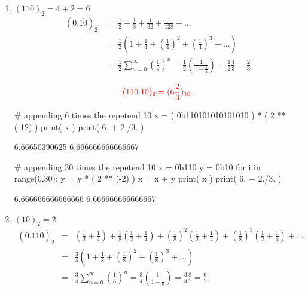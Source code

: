 \documentclass[pdftex,11pt]{article}
\begin{document}
\begin{enumerate}
\item 
$(110)_2 = 4+2 = 6$
\begin{eqnarray}
(0.\overline{10})_{2} 
\nonumber & = & \frac{1}{2}+ \frac{1}{8}+ \frac{1}{32}+ \frac{1}{128}+\ldots\\
\nonumber & = & \frac{1}{2}\left(1 + \frac{1}{4}+ \left(\frac{1}{4}\right)^2+ \left(\frac{1}{4}\right)^3+\ldots \right)\\
\nonumber & = & \frac{1}{2}\sum_{n=0}^\infty\left(\frac{1}{4}\right)^n
 = \frac{1}{2}\left(\frac{1}{1-\frac{1}{4}}\right)
 = \frac{1}{2}\frac{4}{3}
 = \frac{2}{3}
\end{eqnarray}

$$\color{red}(110.\overline{10})_2 = (6\frac{2}{3})_{10} .$$


\begin{python}
# appending 6 times the repetend 10
x = ( 0b110101010101010 ) * ( 2 ** (-12) )
print( x )
print( 6. + 2./3. )
\end{python}
\begin{pythonoutput}
6.66650390625
6.666666666666667
\end{pythonoutput}

\begin{python}
# appending 30 times the repetend 10
x = 0b110
y = 0b10
for i in range(0,30):
  y = y * ( 2 ** (-2) )
  x = x + y
print( x )
print( 6. + 2./3. )
\end{python}
\begin{pythonoutput}
6.666666666666666
6.666666666666667
\end{pythonoutput}







\item 
$(10)_2 = 2 $
\begin{eqnarray}
(0.\overline{110})_{2} 
\nonumber & = & \left(\frac{1}{2}+ \frac{1}{4}\right)+ \frac{1}{8}\left(\frac{1}{2}+ \frac{1}{4}\right)
+ \left(\frac{1}{8}\right)^2\left(\frac{1}{2}+ \frac{1}{4}\right)
+ \left(\frac{1}{8}\right)^3\left(\frac{1}{2}+ \frac{1}{4}\right)
+ \ldots\\
\nonumber & = & \frac{3}{4}\left(1 + \frac{1}{8}+ \left(\frac{1}{8}\right)^2+ \left(\frac{1}{8}\right)^3+\ldots \right)\\
\nonumber & = & \frac{3}{4}\sum_{n=0}^\infty\left(\frac{1}{8}\right)^n
 = \frac{3}{4}\left(\frac{1}{1-\frac{1}{8}}\right)
 = \frac{3}{4}\frac{8}{7}
 = \frac{6}{7}
\end{eqnarray}


\end{enumerate}
\end{document}
